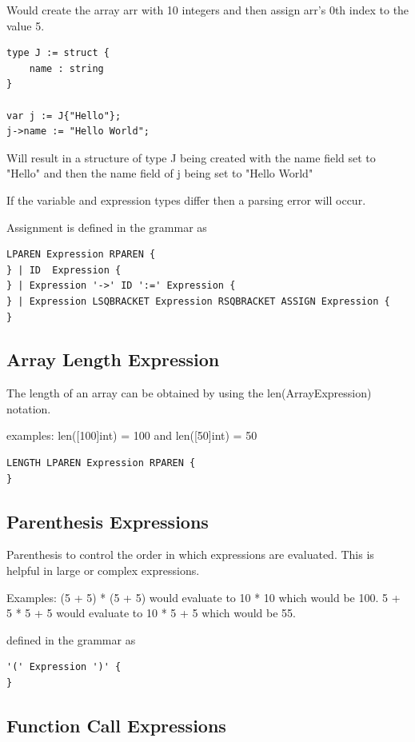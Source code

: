 \documentclass[]{final_report}
\begin{document}
Would create the array arr with 10 integers and then assign arr's 0th index to the value 5.

\begin{verbatim}
type J := struct {
	name : string
}

var j := J{"Hello"};
j->name := "Hello World";
\end{verbatim}
Will result in a structure of type J being created with the name field set to "Hello" and then the name field of j being set to "Hello World"

If the variable and expression types differ then a parsing error will occur.

Assignment is defined in the grammar as
\begin{verbatim}
LPAREN Expression RPAREN {
} | ID  Expression {
} | Expression '->' ID ':=' Expression {
} | Expression LSQBRACKET Expression RSQBRACKET ASSIGN Expression {
} 
\end{verbatim}

\subsection{Array Length Expression}

The length of an array can be obtained by using the len(ArrayExpression) notation.

examples:
len([100]int) = 100 and len([50]int) = 50

\begin{verbatim}LENGTH LPAREN Expression RPAREN {
}
\end{verbatim}

\subsection{Parenthesis Expressions}

Parenthesis to control the order in which expressions are evaluated. This is helpful in large or complex expressions.

Examples: (5 + 5) * (5 + 5) would evaluate to 10 * 10 which would be 100. 5 + 5 * 5 + 5 would evaluate to 10 * 5 + 5 which would be 55.

defined in the grammar as
\begin{verbatim}
'(' Expression ')' {
}
\end{verbatim}

\subsection{Function Call Expressions}
\end{document}
